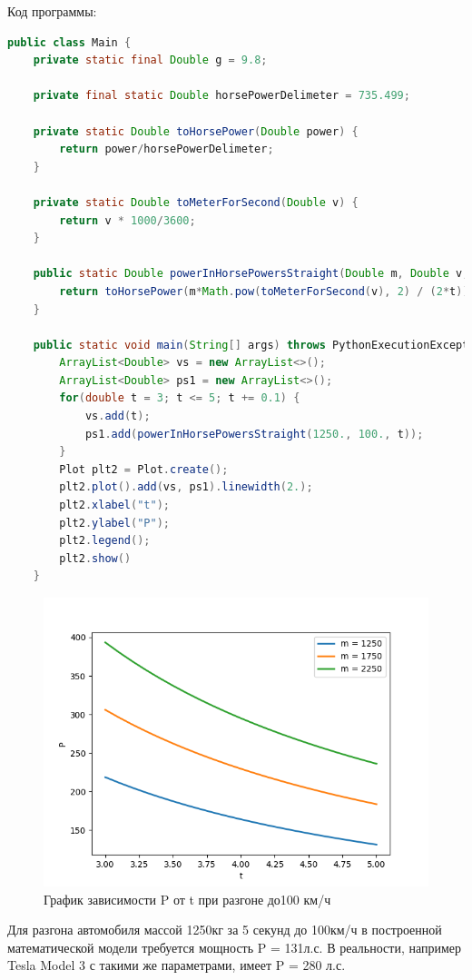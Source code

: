 \documentclass[a4paper, 14pt]{extarticle}
\begin{document}
			Код программы:
			\begin{lstlisting}[language=Java]
public class Main {
	private static final Double g = 9.8;
	
	private final static Double horsePowerDelimeter = 735.499;
	
	private static Double toHorsePower(Double power) {
		return power/horsePowerDelimeter;
	}
	
	private static Double toMeterForSecond(Double v) {
		return v * 1000/3600;
	}
	
	public static Double powerInHorsePowersStraight(Double m, Double v, Double t) {
		return toHorsePower(m*Math.pow(toMeterForSecond(v), 2) / (2*t));
	}
	
	public static void main(String[] args) throws PythonExecutionException, IOException {
		ArrayList<Double> vs = new ArrayList<>();
		ArrayList<Double> ps1 = new ArrayList<>();
		for(double t = 3; t <= 5; t += 0.1) {
			vs.add(t);
			ps1.add(powerInHorsePowersStraight(1250., 100., t));
		}
		Plot plt2 = Plot.create();
		plt2.plot().add(vs, ps1).linewidth(2.);
		plt2.xlabel("t");
		plt2.ylabel("P");
		plt2.legend();
		plt2.show()
	}
			\end{lstlisting}
			\begin{figure}[H]
				\centering
				\includegraphics[width = \linewidth]{fig3.png}
				\caption[.] {График зависимости P от t при разгоне до100 км/ч}
			\end{figure}
			Для разгона автомобиля массой 1250кг за 5 секунд до 100км/ч в 
			построенной математической модели требуется мощность P = 131л.с.
			В реальности, например Tesla Model 3 с такими же параметрами, имеет P = 280 л.с.
\end{document}
